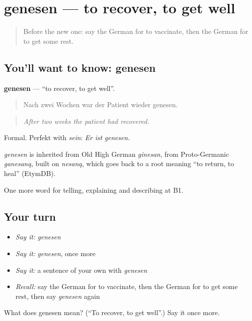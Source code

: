 \section[genesen]{genesen — to recover, to get well}

\label{lesson:GE-C488-genesen}



\begin{quote}
Before the new one: say the German for to vaccinate, then the German for to get some rest.
\end{quote}

\subsection*{You'll want to know: genesen}
\textbf{genesen} — \textquotedblleft{}to recover, to get well\textquotedblright{}.

\begin{quote}
Nach zwei Wochen war der Patient wieder genesen.
\end{quote}

\begin{quote}
\emph{After two weeks the patient had recovered.}
\end{quote}

Formal. Perfekt with \emph{sein}: \emph{Er ist genesen.}

\begin{cousinweb}
\emph{genesen} is inherited from Old High German \emph{ginesan}, from Proto-Germanic \emph{ganesaną}, built on \emph{nesaną}, which goes back to a root meaning \textquotedblleft{}to return, to heal\textquotedblright{} (EtymDB).
\end{cousinweb}

\begin{grammarlens}[title={What you've built}]
One more word for telling, explaining and describing at B1.
\end{grammarlens}

\subsection*{Your turn}
\begin{itemize}
\raggedright
  \item \emph{Say it:} \emph{genesen}
  \item \emph{Say it:} \emph{genesen}, once more
  \item \emph{Say it:} a sentence of your own with \emph{genesen}
  \item \emph{Recall:} say the German for to vaccinate, then the German for to get some rest, then say \emph{genesen} again
\end{itemize}

\begin{tcolorbox}[breakable,colback=teal!4,colframe=teal!35!black,title={Before you move on}]
What does genesen mean? (\textquotedblleft{}To recover, to get well\textquotedblright{}.) Say it once more.
\end{tcolorbox}
